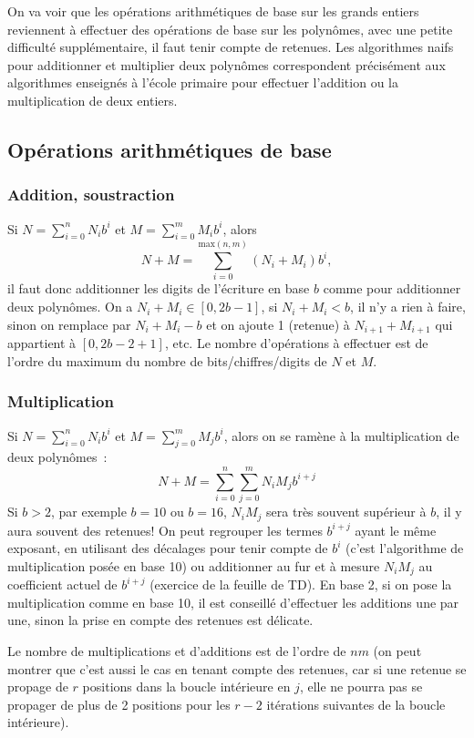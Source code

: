 \documentclass[a4paper,11pt]{book}
\begin{document}
\begin{giacjshere}
On va voir que les op\'erations arithm\'etiques de base sur les grands
entiers reviennent \`a effectuer des op\'erations de base sur les
polyn\^omes, avec une petite difficult\'e suppl\'ementaire, il
faut tenir compte de retenues. Les algorithmes naifs pour additionner
et multiplier deux polyn\^omes correspondent pr\'ecis\'ement aux
algorithmes enseign\'es \`a l'\'ecole primaire pour effectuer
l'addition ou la multiplication de deux entiers.

\subsection{Op\'erations arithm\'etiques de base}
\subsubsection{Addition, soustraction}
Si $N=\sum_{i=0}^n N_i b^i$ et $M=\sum_{i=0}^m M_i b^i$, alors
$$N+M=\sum_{i=0}^{\mbox{max}(n,m)} (N_i+M_i) b^i,$$ 
il faut donc additionner les
digits de l'\'ecriture en base $b$ comme pour additionner deux polyn\^omes. 
On a $N_i+M_i  \in [0,2b-1] $,
si $N_i+M_i<b$, il n'y a rien \`a faire, sinon on remplace par
$N_i+M_i-b$ et on ajoute 1 (retenue) \`a $N_{i+1}+M_{i+1}$
qui appartient \`a $[0,2b-2+1]$, etc.
Le nombre d'op\'erations \`a effectuer est de l'ordre du maximum du
nombre de bits/chiffres/digits de $N$ et $M$.

\subsubsection{Multiplication}
Si $N=\sum_{i=0}^n N_i b^i$ et $M=\sum_{j=0}^m M_j b^i$, alors on
se ram\`ene \`a la multiplication de deux polyn\^omes~:
$$ N+M=\sum_{i=0}^n \sum_{j=0}^m  N_i M_j b^{i+j}$$
Si $b>2$, par exemple $b=10$ ou $b=16$,
$N_i M_j$ sera tr\`es souvent sup\'erieur \`a $b$, il y aura souvent
des retenues!
On peut regrouper les termes $b^{i+j}$ ayant le m\^eme exposant,
en utilisant des d\'ecalages pour tenir compte de $b^i$ (c'est
l'algorithme de multiplication pos\'ee en base 10) ou additionner
au fur et \`a mesure $N_i M_j$ au coefficient actuel de $b^{i+j}$ 
(exercice de la feuille de TD). En base 2, si on pose
la multiplication comme en base 10, il est conseill\'e d'effectuer
les additions une par une, sinon la prise en compte des retenues est
d\'elicate. 

Le nombre de multiplications et d'additions est de l'ordre de $nm$
(on peut montrer que c'est aussi le cas en tenant compte des retenues,
car si une retenue se propage de $r$ positions dans la boucle
int\'erieure en $j$, elle ne pourra pas se propager de plus de 2
positions pour les $r-2$ it\'erations suivantes de la boucle
int\'erieure).


\end{giacjshere}
\end{document}
